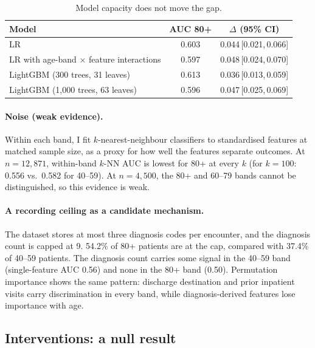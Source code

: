 \documentclass{article}
\newcommand{\ci}[2]{\,\mbox{[#1,\,#2]}}
\begin{document}
\begin{table}[h]
\centering\small
\caption{Model capacity does not move the gap.}
\label{tab:modelclass}
\begin{tabular}{@{}lcc@{}}
\toprule
Model & AUC 80+ & $\Delta$ (95\% CI) \\
\midrule
LR & 0.603 & 0.044\ci{0.021}{0.066} \\
LR with age-band $\times$ feature interactions & 0.597 & 0.048\ci{0.024}{0.070} \\
LightGBM (300 trees, 31 leaves) & 0.613 & 0.036\ci{0.013}{0.059} \\
LightGBM (1,000 trees, 63 leaves) & 0.596 & 0.047\ci{0.025}{0.069} \\
\bottomrule
\end{tabular}
\end{table}

\paragraph{Noise (weak evidence).} Within each band, I fit $k$-nearest-neighbour classifiers to standardised features at matched sample size, as a proxy for how well the features separate outcomes. At $n = 12{,}871$, within-band $k$-NN AUC is lowest for 80+ at every $k$ (for $k = 100$: 0.556 vs.\ 0.582 for 40--59). At $n = 4{,}500$, the 80+ and 60--79 bands cannot be distinguished, so this evidence is weak.

\paragraph{A recording ceiling as a candidate mechanism.} The dataset stores at most three diagnosis codes per encounter, and the diagnosis count is capped at 9. 54.2\% of 80+ patients are at the cap, compared with 37.4\% of 40--59 patients. The diagnosis count carries some signal in the 40--59 band (single-feature AUC 0.56) and none in the 80+ band (0.50). Permutation importance shows the same pattern: discharge destination and prior inpatient visits carry discrimination in every band, while diagnosis-derived features lose importance with age.

\subsection{Interventions: a null result}
\end{document}
